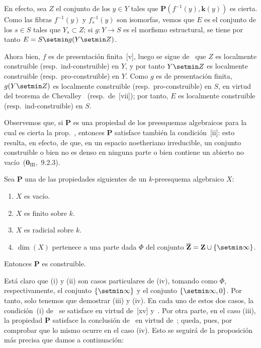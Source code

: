 En efecto, sea $Z$ el conjunto de los $y\in Y$ tales que $\boldsymbol{P}(f^{-1}(y),\boldsymbol{k}(y))$ es cierta.
Como las fibras $f^{-1}(y)$ y $f_s^{-1}(y)$ son isomorfas, vemos que $E$ es el conjunto de los $s\in S$ tales que $Y_s\subset Z$; si $g:Y\to S$ es el morfismo estructural, se tiene por tanto $E=S\setmin g(Y\setmin Z)$.


Ahora bien, $f$ es de presentación finita~[v], luego se sigue de~ que $Z$ es localmente construible (resp.\ ind-construible) en $Y$, y por tanto $Y\setmin Z$ es localmente construible (resp.\ pro-construible) en $Y$.
Como $g$ es de presentación finita, $g(Y\setmin Z)$ es localmente construible (resp.\ pro-construible) en $S$, en virtud del teorema de Chevalley~ (resp.\ de~[vii]); por tanto, $E$ es localmente construible (resp.\ ind-construible) en $S$.

\begin{remark}[9.2.5]
\label{IV.9.2.5}
Observemos que, si $\boldsymbol{P}$ es una propiedad de los preesquemas algebraicos para la cual es cierta la prop.~, entonces $\boldsymbol{P}$ satisface también la condición~[ii]: esto resulta, en efecto, de que, en un espacio noetheriano irreducible, un conjunto construible o bien no es denso en ninguna parte o bien contiene un abierto no vacío~($\mathbf{0}_{\mathrm{III}}$,~9.2.3).
\end{remark}

\begin{proposition}[9.2.6]
\label{IV.9.2.6}
Sea $\boldsymbol{P}$ una de las propiedades siguientes de un $k$-preesquema algebraico $X$:
\begin{enumerate}[label=\textup{(\roman*)}]
  \item $X$ es vacío.
  \item $X$ es finito sobre $k$.
  \item $X$ es radicial sobre $k$.
  \item $\dim(X)$ pertenece a una parte dada $\Phi$ del conjunto $\overline{\mathbf{Z}}=\mathbf{Z}\cup\{\setmin\infty\}$.
\end{enumerate}
Entonces $\boldsymbol{P}$ es construible.
\end{proposition}

Está claro que (i) y (ii) son casos particulares de (iv), tomando como $\Phi$, respectivamente, el conjunto $\{\setmin\infty\}$ y el conjunto $\{\setmin\infty,0\}$.
Por tanto, solo tenemos que demostrar (iii) y (iv).
En cada uno de estos dos casos, la condición~(i) de~ se satisface en virtud de~[xv] y~.
Por otra parte, en el caso (iii), la propiedad $\boldsymbol{P}$ satisface la conclusión de~ en virtud de~; queda, pues, por comprobar que lo mismo ocurre en el caso (iv).
Esto se seguirá de la proposición más precisa que damos a continuación:

